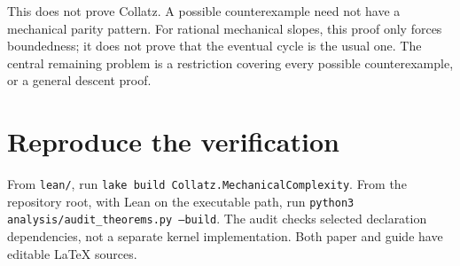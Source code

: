 \documentclass[10pt]{article}
\begin{document}
This does not prove Collatz. A possible counterexample need not have a
mechanical parity pattern. For rational mechanical slopes, this proof only
forces boundedness; it does not prove that the eventual cycle is the usual
one. The central remaining problem is a restriction covering every possible
counterexample, or a general descent proof.

\section*{Reproduce the verification}
From \texttt{lean/}, run
\texttt{lake build Collatz.MechanicalComplexity}.
From the repository root, with Lean on the executable path, run
\texttt{python3 analysis/audit\_theorems.py --build}.
The audit checks selected declaration dependencies, not a separate kernel
implementation. Both paper and guide have editable LaTeX sources.
\end{document}
